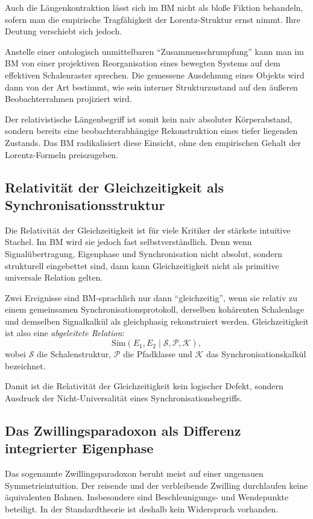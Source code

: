 \documentclass[12pt,a4paper]{article}
\begin{document}
	Auch die Längenkontraktion lässt sich im BM nicht als bloße Fiktion behandeln, sofern man die empirische Tragfähigkeit der Lorentz-Struktur ernst nimmt. Ihre Deutung verschiebt sich jedoch.
	
	Anstelle einer ontologisch unmittelbaren ``Zusammenschrumpfung'' kann man im BM von einer projektiven Reorganisation eines bewegten Systems auf dem effektiven Schalenraster sprechen. Die gemessene Ausdehnung eines Objekts wird dann von der Art bestimmt, wie sein interner Strukturzustand auf den äußeren Beobachterrahmen projiziert wird.
	
	Der relativistische Längenbegriff ist somit kein naiv absoluter Körperabstand, sondern bereits eine beobachterabhängige Rekonstruktion eines tiefer liegenden Zustands. Das BM radikalisiert diese Einsicht, ohne den empirischen Gehalt der Lorentz-Formeln preiszugeben.
	
	\subsection{Relativität der Gleichzeitigkeit als Synchronisationsstruktur}
	
	Die Relativität der Gleichzeitigkeit ist für viele Kritiker der stärkste intuitive Stachel. Im BM wird sie jedoch fast selbstverständlich. Denn wenn Signalübertragung, Eigenphase und Synchronisation nicht absolut, sondern strukturell eingebettet sind, dann kann Gleichzeitigkeit nicht als primitive universale Relation gelten.
	
	Zwei Ereignisse sind BM-sprachlich nur dann ``gleichzeitig'', wenn sie relativ zu einem gemeinsamen Synchronisationsprotokoll, derselben kohärenten Schalenlage und demselben Signalkalkül als gleichphasig rekonstruiert werden. Gleichzeitigkeit ist also eine \emph{abgeleitete Relation}:
	\[
	\mathrm{Sim}(E_1,E_2 \mid \mathcal{S},\mathcal{P},\mathcal{K}),
	\]
	wobei \(\mathcal{S}\) die Schalenstruktur, \(\mathcal{P}\) die Pfadklasse und \(\mathcal{K}\) das Synchronisationskalkül bezeichnet.
	
	Damit ist die Relativität der Gleichzeitigkeit kein logischer Defekt, sondern Ausdruck der Nicht-Universalität eines Synchronisationsbegriffs.
	
	\subsection{Das Zwillingsparadoxon als Differenz integrierter Eigenphase}
	
	Das sogenannte Zwillingsparadoxon beruht meist auf einer ungenauen Symmetrieintuition. Der reisende und der verbleibende Zwilling durchlaufen keine äquivalenten Bahnen. Insbesondere sind Beschleunigungs- und Wendepunkte beteiligt. In der Standardtheorie ist deshalb kein Widerspruch vorhanden.
	
\end{document}
